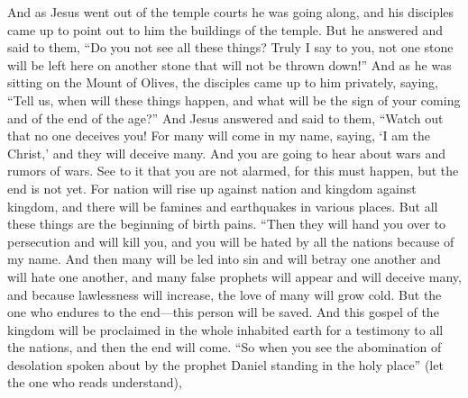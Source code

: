 \begin{biblechapter} %
 And as Jesus went out of the temple courts he was going along, and his disciples came up to point out to him the buildings of the temple.
\verse But he answered and said to them, “Do you not see all these things? Truly I say to you, not one stone will be left here on another stone that will not be thrown down!”
 And as he was sitting on the Mount of Olives, the disciples came up to him privately, saying, “Tell us, when will these things happen, and what will be the sign of your coming and of the end of the age?”
\verse And Jesus answered and said to them, “Watch out that no one deceives you!
\verse For many will come in my name, saying, ‘I am the Christ,’ and they will deceive many.
\verse And you are going to hear about wars and rumors of wars. See to it that you are not alarmed, for this must happen, but the end is not yet.
\verse For nation will rise up against nation and kingdom against kingdom, and there will be famines and earthquakes in various places.
\verse But all these things are the beginning of birth pains.
 “Then they will hand you over to persecution and will kill you, and you will be hated by all the nations because of my name.
\verse And then many will be led into sin and will betray one another and will hate one another,
\verse and many false prophets will appear and will deceive many,
\verse and because lawlessness will increase, the love of many will grow cold.
\verse But the one who endures to the end—this person will be saved.
\verse And this gospel of the kingdom will be proclaimed in the whole inhabited earth for a testimony to all the nations, and then the end will come.
 “So when you see the abomination of desolation spoken about by the prophet Daniel standing in the holy place” (let the one who reads understand),

\end{biblechapter}
